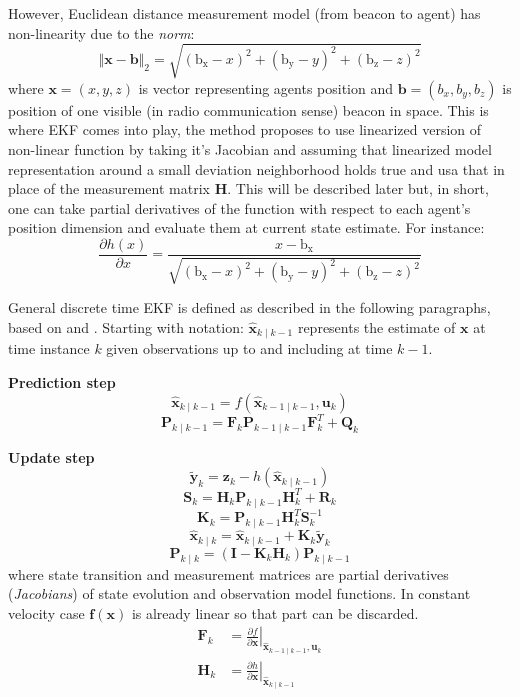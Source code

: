 However, Euclidean distance measurement model (from beacon to agent) has non-linearity due to the \emph{norm}:
$$
    \Vert\boldsymbol{x}-\boldsymbol{b}\Vert_2 = \sqrt{{\left(\mathrm{b_x}-x\right)}^2+{\left(\mathrm{b_y}-y\right)}^2+{\left(\mathrm{b_z}-z\right)}^2}
$$
where $\boldsymbol{x} = (x,y,z)$ is vector representing agents position and $\boldsymbol{b} = (b_x,b_y,b_z)$ is position of one visible (in radio communication sense) beacon in space. This is where EKF comes into play, the method proposes to use linearized version of non-linear function by taking it's Jacobian and assuming that linearized model representation around a small deviation neighborhood holds true and usa that in place of the measurement matrix $\boldsymbol{H}$. This will be described later but, in short, one can take partial derivatives of the function with respect to each agent's position dimension and evaluate them at current state estimate. For instance:
$$
    \frac{\partial h(x)}{\partial x} = \frac{x-\mathrm{b_x}}{\sqrt{{\left(\mathrm{b_x}-x\right)}^2+{\left(\mathrm{b_y}-y\right)}^2+{\left(\mathrm{b_z}-z\right)}^2}}
$$

General discrete time EKF is defined as described in the following paragraphs, based on \cite{probrobotics} and \cite{welch1995introduction}. Starting with notation: $\hat{\mathbf{x}}_{k \mid k-1}$ represents the  estimate of $\mathbf{x}$ at time instance $k$ given observations up to and including at time $k-1$. \smallskip

\textbf{Prediction step} \smallskip
$$\hat{\boldsymbol{x}}_{k \mid k-1}=f\left(\hat{\boldsymbol{x}}_{k-1 \mid k-1}, \boldsymbol{u}_k\right)$$
$$\boldsymbol{P}_{k \mid k-1}=\boldsymbol{F}_k \boldsymbol{P}_{k-1 \mid k-1} \boldsymbol{F}_k^T+\boldsymbol{Q}_k$$

\textbf{Update step} \smallskip
$$\tilde{\boldsymbol{y}}_k=\boldsymbol{z}_k-h\left(\hat{\boldsymbol{x}}_{k \mid k-1}\right)$$
$$\boldsymbol{S}_k=\boldsymbol{H}_k \boldsymbol{P}_{k \mid k-1} \boldsymbol{H}_k^T+\boldsymbol{R}_k$$
$$\boldsymbol{K}_k=\boldsymbol{P}_{k \mid k-1} \boldsymbol{H}_k^T \boldsymbol{S}_k^{-1}$$
$$\hat{\boldsymbol{x}}_{k \mid k}=\hat{\boldsymbol{x}}_{k \mid k-1}+\boldsymbol{K}_k \tilde{\boldsymbol{y}}_k$$
$$\boldsymbol{P}_{k \mid k}=\left(\boldsymbol{I}-\boldsymbol{K}_k \boldsymbol{H}_k\right) \boldsymbol{P}_{k \mid k-1}$$
where state transition and measurement matrices are partial derivatives (\emph{Jacobians}) of state evolution and observation model functions. In constant velocity case $\boldsymbol{f}(\boldsymbol{x})$ is already linear so that part can be discarded.
$$
    \begin{aligned}
        \boldsymbol{F}_k & =\left.\frac{\partial f}{\partial \boldsymbol{x}}\right|_{\hat{\boldsymbol{x}}_{k-1 \mid k-1}, \boldsymbol{u}_k} \\
        \boldsymbol{H}_k & =\left.\frac{\partial h}{\partial \boldsymbol{x}}\right|_{\hat{\boldsymbol{x}}_{k \mid k-1}}
    \end{aligned}
$$

